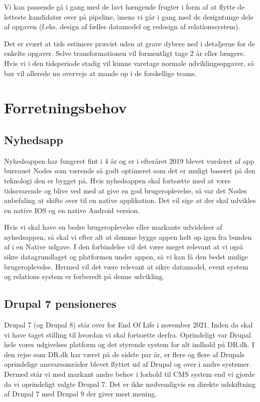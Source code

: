 \documentclass{article}
\begin{document}
Vi kan passende gå i gang med de lavt hængende frugter i form af at flytte de letteste kandidater over på pipeline, imens vi går i gang med de designtunge dele af opgaven (f.eks. design af fælles datamodel og redesign af relationssystem).

Det er svært at tids estimere præcist uden at grave dybere ned i detaljerne for de enkelte opgaver. Selve transformationen vil formentligt tage 2 år eller længere. Hvis vi i den tidsperiode stadig vil kunne varetage normale udviklingsopgaver, så bør vil allerede nu overveje at mande op i de forskellige teams.

\section{Forretningsbehov}


\subsection{Nyhedsapp}
Nyhedsappen har fungeret fint i 4 år og er i efteråret 2019 blevet vurderet af app bureauet Nodes som værende så godt optimeret som det er muligt baseret på den teknologi den er bygget på. Hvis nyhedsappen skal fortsætte med at være tidssvarende og blive ved med at give en god brugeroplevelse, så var det Nodes anbefaling at skifte over til en native applikation. Det vil sige at der skal udvikles en native IOS og en native Android version.

Hvis vi skal have en bedre brugeroplevelse eller markante udvidelser af nyhedsappen, så skal vi efter alt at dømme bygge appen helt op igen fra bunden af i en Native udgave. I den forbindelse vil det være meget relevant at vi også sikre datagrundlaget og platformen under appen, så vi kan få den bedst mulige brugeroplevelse.
Hermed vil det være relevant at sikre datamodel, event system og relations system er forberedt på denne udvikling.

\subsection{Drupal 7 pensioneres}
Drupal 7 (og Drupal 8) står over for End Of Life i november 2021. Inden da skal vi have taget stilling til hvordan vi skal fortsætte derfra.
Oprindeligt var Drupal hele vores udgivelses platform og det styrende system for alt indhold på DR.dk. I den rejse som DR.dk har været på de sidste par år, er flere og flere af Drupals oprindelige ansvarsområder blevet flyttet ud af Drupal og over i andre systemer. Dermed står vi med markant andre behov i forhold til CMS system end vi gjorde da vi oprindeligt valgte Drupal 7. Det er ikke nødvendigvis en direkte udskiftning af Drupal 7 med Drupal 9 der giver mest mening. 
\end{document}
